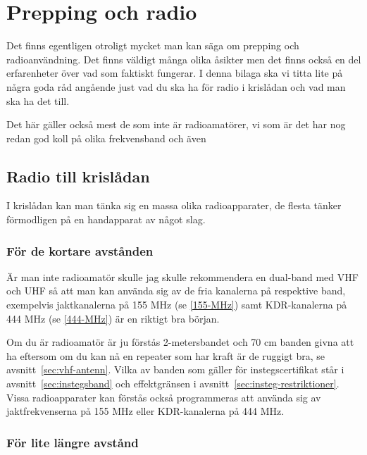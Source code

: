 
\appendix

\chapter{Prepping och radio}
\label{sec:prepping}

Det finns egentligen otroligt mycket man kan säga om prepping och
radioanvändning. Det finns väldigt många olika åsikter men det finns också en
del erfarenheter över vad som faktiskt fungerar. I denna bilaga ska vi titta
lite på några goda råd angående just vad du ska ha för radio i krislådan och
vad man ska ha det till.

Det här gäller också mest de som inte är radioamatörer, vi som är det har nog
redan god koll på olika frekvensband och även

\vfill \minitoc \clearpage

\section{Radio till krislådan}
\label{sec:krislada}

I krislådan kan man tänka sig en massa olika radioapparater, de flesta tänker
förmodligen på en handapparat av något slag.

\subsection{För de kortare avstånden}

Är man inte radioamatör skulle jag skulle rekommendera en dual-band med VHF
och UHF så att man kan använda sig av de fria kanalerna på respektive band,
exempelvis jaktkanalerna på 155 MHz (se \ref{155-MHz})  samt KDR-kanalerna på
444 MHz (se \ref{444-MHz}) är en riktigt bra början.

Om du är radioamatör är ju förstås 2-metersbandet och 70 cm banden givna att
ha eftersom om du kan nå en repeater som har kraft är de ruggigt bra, se
avsnitt~\ref{sec:vhf-antenn}. Vilka av banden som gäller för
instegscertifikat står i avsnitt~\ref{sec:instegsband} och effektgränsen i
avsnitt~\ref{sec:insteg-restriktioner}. Vissa
radioapparater kan förstås också programmeras att använda sig av
jaktfrekvenserna på 155 MHz eller KDR-kanalerna på 444 MHz.

\subsection{För lite längre avstånd}

